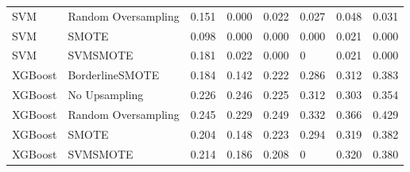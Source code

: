 \begin{tabular}{llllllll}
                         SVM & Random Oversampling & 0.151 &                     0.000 &                 0.022 &                  0.027 &                                   0.048 &     0.031 \\
                         SVM &               SMOTE & 0.098 &                     0.000 &                 0.000 &                  0.000 &                                   0.021 &     0.000 \\
                         SVM &            SVMSMOTE & 0.181 &                     0.022 &                 0.000 &                      0 &                                   0.021 &     0.000 \\
                     XGBoost &     BorderlineSMOTE & 0.184 &                     0.142 &                 0.222 &                  0.286 &                                   0.312 &     0.383 \\
                     XGBoost &       No Upsampling & 0.226 &                     0.246 &                 0.225 &                  0.312 &                                   0.303 &     0.354 \\
                     XGBoost & Random Oversampling & 0.245 &                     0.229 &                 0.249 &                  0.332 &                                   0.366 &     0.429 \\
                     XGBoost &               SMOTE & 0.204 &                     0.148 &                 0.223 &                  0.294 &                                   0.319 &     0.382 \\
                     XGBoost &            SVMSMOTE & 0.214 &                     0.186 &                 0.208 &                      0 &                                   0.320 &     0.380 \\
\bottomrule
\end{tabular}
